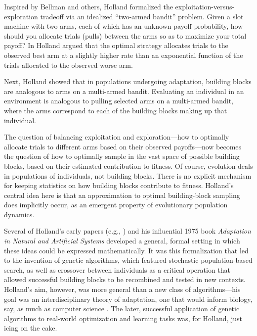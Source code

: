 \documentclass{sig-alternate}
\begin{document}
Inspired by Bellman \cite{Bellman1961} and
others, Holland formalized the exploitation-versus-exploration tradeoff
via an idealized ``two-armed bandit'' problem. Given a slot machine
with two arms, each of which has an unknown payoff probability, how
should you allocate trials (pulls) between the arms so as to
maximize your total payoff?   In \cite{Holland1973,Holland1975}
Holland argued that the optimal strategy
allocates trials to the observed best arm at a slightly higher rate than
an exponential function of the trials allocated to the observed worse arm.  

Next, Holland showed that in populations undergoing adaptation,
building blocks are analogous to arms on a multi-armed bandit.  
Evaluating an individual in an environment is analogous to pulling selected
arms on a multi-armed bandit, where the arms correspond to each of the
building blocks making up that individual.

The question of balancing exploitation and exploration---how to
optimally allocate trials to different arms based on their observed 
payoffs---now becomes the question of how to optimally sample in the
vast space of possible building blocks, based on their estimated
contribution to fitness.  Of course, evolution deals in populations of
individuals, not building blocks.  There is no {\emph explicit} mechanism for
keeping statistics on how building blocks contribute to fitness. 
Holland's central idea here is that an approximation to
optimal building-block sampling does implicitly occur, as an emergent
property of evolutionary population dynamics.

Several of Holland's early papers (e.g.,
\cite{Holland1962,Holland1973}) and his influential 1975 book
\emph{Adaptation in Natural and Artificial Systems} \cite{Holland1975}
developed a general, formal setting in which these ideas could be
expressed mathematically.  It was this formalization that led to the
invention of genetic algorithms, which featured stochastic
population-based search, as well as crossover between individuals as a
critical operation that allowed successful building blocks to be
recombined and tested in new contexts.  Holland's aim, however, was
more general than a new class of algorithms---his goal was an
interdisciplinary theory of adaptation, one that would inform biology, 
say, as much as computer science \cite{Christiansen1998}.  The later, successful application of
genetic algorithms to real-world optimization and learning tasks was,
for Holland, just icing on the cake.
\end{document}
